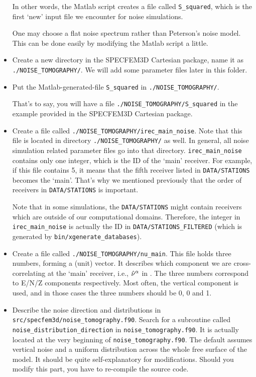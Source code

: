 \begin{itemize}
In other words, the Matlab script creates a file called \texttt{S\_squared},
which is the first `new' input file we encounter for noise simulations.

One may choose a flat noise spectrum rather than Peterson's noise
model. This can be done easily by modifying the Matlab script a little.

\item Create a new directory in the SPECFEM3D Cartesian package, name it
as \texttt{./NOISE\_TOMOGRAPHY/}. We will add some parameter
files later in this folder.

\item Put the Matlab-generated-file \texttt{S\_squared} in \texttt{./NOISE\_TOMOGRAPHY/}.

That's to say, you will have a file \texttt{./NOISE\_TOMOGRAPHY/S\_squared}
in the example provided in the SPECFEM3D Cartesian package.

\item Create a file called \texttt{./NOISE\_TOMOGRAPHY/irec\_main\_noise}.
Note that this file is located in directory \texttt{./NOISE\_TOMOGRAPHY/}
as well. In general, all noise simulation related parameter files
go into that directory. \texttt{irec\_main\_noise} contains only
one integer, which is the ID of the `main' receiver. For example,
if this file contains 5, it means that the fifth receiver listed in
\texttt{DATA/STATIONS} becomes the `main'. That's why we mentioned
previously that the order of receivers in \texttt{DATA/STATIONS} is
important.


Note that in some simulations, the \texttt{DATA/STATIONS} might
contain receivers which are outside of our computational domains.
Therefore, the integer in \texttt{irec\_main\_noise} is actually
the ID in \texttt{DATA/STATIONS\_FILTERED} (which is generated by
\texttt{bin/xgenerate\_databases}).

\item Create a file called \texttt{./NOISE\_TOMOGRAPHY/nu\_main}.
This file holds three numbers, forming a (unit) vector. It describes
which component we are cross-correlating at the `main' receiver,
i.e., ${\hat{{\bf \nu}}}^{\alpha}$ in \citet{trompetal2010}. The
three numbers correspond to E/N/Z components respectively. Most often,
the vertical component is used, and in those cases the three numbers
should be 0, 0 and 1.

\item Describe the noise direction and distributions in \texttt{src/specfem3d/noise\_tomography.f90}.
Search for a subroutine called \texttt{noise\_distribution\_direction}
in \texttt{noise\_tomography.f90}. It is actually located at the very
beginning of \texttt{noise\_tomography.f90}. The default assumes vertical
noise and a uniform distribution across the whole free surface of
the model. It should be quite self-explanatory for modifications.
Should you modify this part, you have to re-compile the source code.
\end{itemize}

